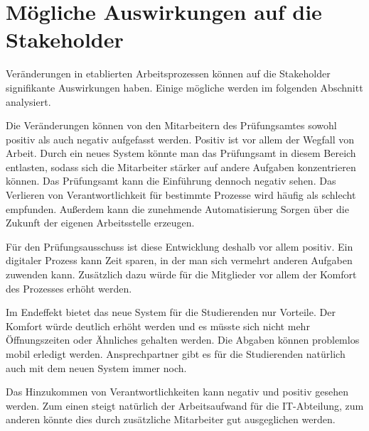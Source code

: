 \section{Mögliche Auswirkungen auf die Stakeholder}

Veränderungen in etablierten Arbeitsprozessen können auf die Stakeholder signifikante Auswirkungen haben. Einige mögliche werden im folgenden Abschnitt analysiert.

Die Veränderungen können von den Mitarbeitern des Prüfungsamtes sowohl positiv als auch negativ aufgefasst werden. Positiv ist vor allem der Wegfall von Arbeit. Durch ein neues System könnte man das Prüfungsamt in diesem Bereich entlasten, sodass sich die Mitarbeiter stärker auf andere Aufgaben konzentrieren können. Das Prüfungsamt kann die Einführung dennoch negativ sehen. Das Verlieren von Verantwortlichkeit für bestimmte Prozesse wird häufig als schlecht empfunden. Außerdem kann die zunehmende Automatisierung Sorgen über die Zukunft der eigenen Arbeitsstelle erzeugen.

Für den Prüfungsausschuss ist diese Entwicklung deshalb vor allem positiv. Ein digitaler Prozess kann Zeit sparen, in der man sich vermehrt anderen Aufgaben zuwenden kann. Zusätzlich dazu würde für die Mitglieder vor allem der Komfort des Prozesses erhöht werden.

Im Endeffekt bietet das neue System für die Studierenden nur Vorteile. Der Komfort würde deutlich erhöht werden und es müsste sich nicht mehr Öffnungszeiten oder Ähnliches gehalten werden. Die Abgaben können problemlos mobil erledigt werden. Ansprechpartner gibt es für die Studierenden natürlich auch mit dem neuen System immer noch.

Das Hinzukommen von Verantwortlichkeiten kann negativ und positiv gesehen werden. Zum einen steigt natürlich der Arbeitsaufwand für die IT-Abteilung, zum anderen könnte dies durch zusätzliche Mitarbeiter gut ausgeglichen werden.